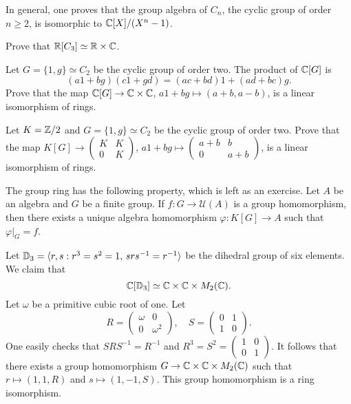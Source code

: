 In general, one proves that the group algebra of $C_n$, the cyclic group of order $n\geq2$, 
is isomorphic to $\mathbb{C}[X]/(X^n-1)$.

\begin{exercise}
\label{xca:RC3}
	Prove that $\mathbb{R}[C_3]\simeq\mathbb{R}\times\mathbb{C}$. 	
\end{exercise}

\begin{exercise}
	Let $G=\{1,g\}\simeq C_2$ be the cyclic group of order two. The product
	of $\mathbb{C}[G]$ is 
	\[
	(a1+bg)(c1+gd)=(ac+bd)1+(ad+bc)g.
	\]
	Prove that the map $\mathbb{C}[G]\to \mathbb{C}\times \mathbb{C}$, $a1+bg\mapsto (a+b,a-b)$, 
	is a linear isomorphism of rings. 
\end{exercise}

\begin{exercise}
	Let $K=\mathbb{Z}/2$ and $G=\{1,g\}\simeq C_2$ be the cyclic group of order two. 
	Prove that the map $K[G]\to\begin{pmatrix}
		K&K\\
		0&K
	\end{pmatrix}$, $a1+bg\mapsto\begin{pmatrix}
		a+b&b\\
		0&a+b		
	\end{pmatrix}$, is a linear isomorphism of rings.
\end{exercise}

The group ring has the following property, which is left as an exercise. 
Let $A$ be an algebra and
$G$ be a finite group. If $f\colon G\to\mathcal{U}(A)$ is a group homomorphism, 
then there exists a unique algebra homomorphism $\varphi\colon K[G]\to A$ such that
$\varphi|_G=f$. 

\begin{example}
	Let $\mathbb{D}_3=\langle r,s:r^3=s^2=1,\,srs^{-1}=r^{-1}\rangle$ be the dihedral
	group of six elements. We claim that 
	\[
	\mathbb{C}[\mathbb{D}_3]\simeq\mathbb{C}\times\mathbb{C}\times M_2(\mathbb{C}).
	\]
	Let $\omega$ be a primitive cubic root of one. Let 
	\[
	R=\begin{pmatrix}
		\omega&0\\
		0&\omega^2	
	\end{pmatrix},
	\quad
	S=\begin{pmatrix}
		0&1\\
		1&0
	\end{pmatrix}.
 	\]
 	One easily checks that $SRS^{-1}=R^{-1}$ and $R^3=S^2=\begin{pmatrix}
		1&0\\
		0&1	
	\end{pmatrix}$. It follows that there exists a group homomorphism
	$G\to\mathbb{C}\times\mathbb{C}\times M_2(\mathbb{C})$ such that
	$r\mapsto (1,1,R)$ and $s\mapsto (1,-1,S)$. This group homomorphism
	is a ring isomorphism.  
\end{example}




 